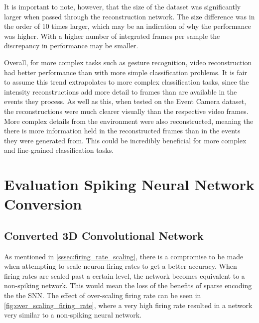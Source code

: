 It is important to note, however, that the size of the dataset was significantly larger when passed through the reconstruction network. The size difference was in the order of 10 times larger, which may be an indication of why the performance was higher. With a higher number of integrated frames per sample the discrepancy in performance may be smaller.

Overall, for more complex tasks such as gesture recognition, video reconstruction had better performance than with more simple classification problems. It is fair to assume this trend extrapolates to more complex classification tasks, since the intensity reconstructions add more detail to frames than are available in the events they process. As well as this, when tested on the Event Camera dataset, the reconstructions were much clearer visually than the respective video frames. More complex details from the environment were also reconstructed, meaning the there is more information held in the reconstructed frames than in the events they were generated from. This could be incredibly beneficial for more complex and fine-grained classification tasks.

\section{Evaluation Spiking Neural Network Conversion}

\subsection{Converted 3D Convolutional Network}

As mentioned in \cref{sssec:firing_rate_scaling}, there is a compromise to be made when attempting to scale neuron firing rates to get a better accuracy. When firing rates are scaled past a certain level, the network becomes equivalent to a non-spiking network. This would mean the loss of the benefits of sparse encoding the the SNN. The effect of over-scaling firing rate can be seen in \cref{fig:over_scaling_firing_rate}, where a very high firing rate resulted in a network very similar to a non-spiking neural network.

